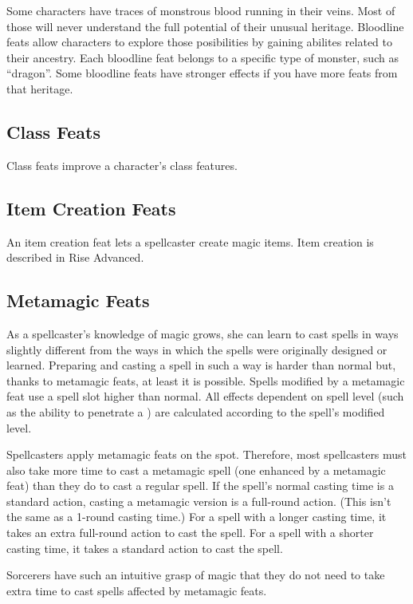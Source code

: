Some characters have traces of monstrous blood running in their veins.
Most of those will never understand the full potential of their unusual heritage.
Bloodline feats allow characters to explore those posibilities by gaining abilites related to their ancestry.
Each bloodline feat belongs to a specific type of monster, such as ``dragon''.
Some bloodline feats have stronger effects if you have more feats from that heritage.

\subsection{Class Feats}
Class feats improve a character's class features.

\subsection{Item Creation Feats}
An item creation feat lets a spellcaster create magic items.
Item creation is described in Rise Advanced.

\subsection{Metamagic Feats}
As a spellcaster's knowledge of magic grows, she can learn to cast spells in ways slightly different from the ways in which the spells were originally designed or learned.
Preparing and casting a spell in such a way is harder than normal but, thanks to metamagic feats, at least it is possible.
Spells modified by a metamagic feat use a spell slot higher than normal.
All effects dependent on spell level (such as the ability to penetrate a ) are calculated according to the spell's modified level.

Spellcasters apply metamagic feats on the spot.
Therefore, most spellcasters must also take more time to cast a metamagic spell (one enhanced by a metamagic feat) than they do to cast a regular spell.
If the spell's normal casting time is a standard action, casting a metamagic version is a full-round action.
(This isn't the same as a 1-round casting time.) For a spell with a longer casting time, it takes an extra full-round action to cast the spell.
For a spell with a shorter casting time, it takes a standard action to cast the spell.

\par Sorcerers have such an intuitive grasp of magic that they do not need to take extra time to cast spells affected by metamagic feats.

